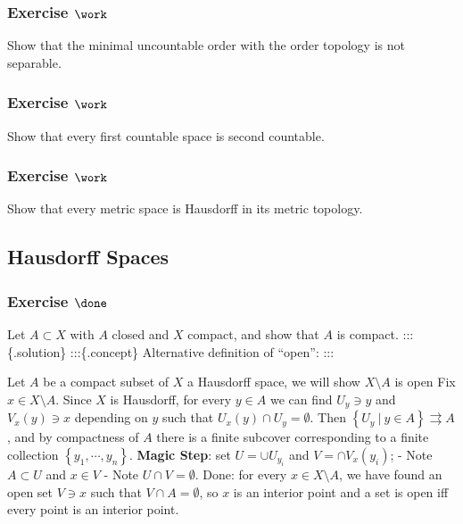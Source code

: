 \hypertarget{exercise-work-36}{%
\subsubsection{\texorpdfstring{Exercise
\(\work\)}{Exercise \textbackslash work}}\label{exercise-work-36}}

Show that the minimal uncountable order with the order topology is not
separable.

\hypertarget{exercise-work-37}{%
\subsubsection{\texorpdfstring{Exercise
\(\work\)}{Exercise \textbackslash work}}\label{exercise-work-37}}

Show that every first countable space is second countable.

\hypertarget{exercise-work-38}{%
\subsubsection{\texorpdfstring{Exercise
\(\work\)}{Exercise \textbackslash work}}\label{exercise-work-38}}

Show that every metric space is Hausdorff in its metric topology.

\hypertarget{hausdorff-spaces}{%
\subsection{Hausdorff Spaces}\label{hausdorff-spaces}}

\hypertarget{exercise-done-2}{%
\subsubsection{\texorpdfstring{Exercise
\(\done\)}{Exercise \textbackslash done}}\label{exercise-done-2}}

Let \(A\subset X\) with \(A\) closed and \(X\) compact, and show that
\(A\) is compact. :::\{.solution\} \hfill :::\{.concept\} \hfill
Alternative definition of ``open'': :::

Let \(A\) be a compact subset of \(X\) a Hausdorff space, we will show
\(X\setminus A\) is open Fix \(x\in X\setminus A\). Since \(X\) is
Hausdorff, for every \(y\in A\) we can find \(U_y \ni y\) and
\(V_x(y) \ni x\) depending on \(y\) such that
\(U_x(y) \cap U_y = \emptyset\). Then
\(\left\{{U_y {~\mathrel{\Big|}~}y\in A}\right\} \rightrightarrows A\),
and by compactness of \(A\) there is a finite subcover corresponding to
a finite collection \(\left\{{y_1, \cdots, y_n}\right\}\). \textbf{Magic
Step}: set \(U = \cup U_{y_i}\) and \(V = \cap V_x(y_i)\); - Note
\(A\subset U\) and \(x\in V\) - Note \(U\cap V = \emptyset\). Done: for
every \(x\in X\setminus A\), we have found an open set \(V\ni x\) such
that \(V\cap A = \emptyset\), so \(x\) is an interior point and a set is
open iff every point is an interior point.

